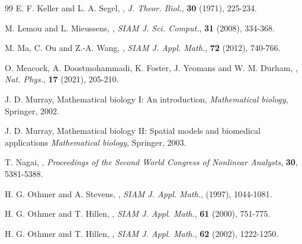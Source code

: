 \documentclass{aims} %
\theoremstyle{definition}
\begin{document}
{\begin{thebibliography}{99}
\newblock E. F. Keller and L. A. Segel, 
\newblock {},
\newblock \emph{J. Theor. Biol.}, \textbf{30} (1971), 225-234.

\newblock M. Lemou and L. Mieussens, 
\newblock {},
\newblock \emph{SIAM J. Sci. Comput.}, \textbf{31} (2008), 334-368.

\newblock M. Ma, C. Ou and Z.-A. Wang, 
\newblock {},
\newblock \emph{SIAM J. Appl. Math.}, \textbf{72} (2012), 740-766.

\newblock O. Meacock, A. Doostmohammadi, K. Foster, J. Yeomans and W. M. Durham,
\newblock {},
\newblock \emph{Nat. Phys.}, \textbf{17} (2021), 205-210.

\newblock J. D. Murray, 
\newblock Mathematical biology I: An introduction,
\newblock \emph{Mathematical biology}, Springer, 2002.

\newblock J. D. Murray, 
\newblock Mathematical biology II: Spatial models and biomedical applications
\newblock \emph{Mathematical biology}, Springer, 2003.

\newblock T. Nagai, 
\newblock {},
\newblock \emph{Proceedings of the Second World Congress of Nonlinear Analysts}, \textbf{30}, 5381-5388.

\newblock H. G. Othmer and A. Stevens, 
\newblock {},
\newblock \emph{SIAM J. Appl. Math.}, \textbf{} (1997), 1044-1081.

\newblock H. G. Othmer and T. Hillen, 
\newblock {},
\newblock \emph{SIAM J. Appl. Math.}, \textbf{61} (2000), 751-775.

\newblock H. G. Othmer and T. Hillen, 
\newblock {},
\newblock \emph{SIAM J. Appl. Math.}, \textbf{62} (2002), 1222-1250.


\end{thebibliography}}
\end{document}
